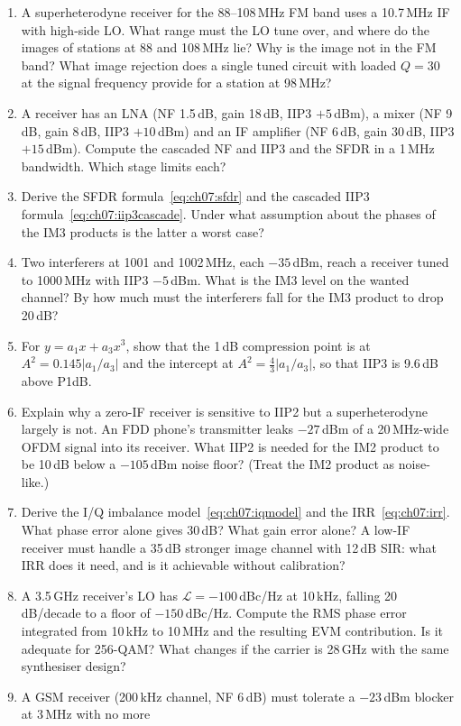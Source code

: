 \problems
\begin{enumerate}[label=\thechapter.\arabic*]
\item A superheterodyne receiver for the 88--108\,MHz FM band uses a 10.7\,MHz IF with high-side LO.
What range must the LO tune over, and where do the images of stations at 88 and 108\,MHz lie? Why is the
image not in the FM band? What image rejection does a single tuned circuit with loaded $Q=30$ at
the signal frequency provide for a station at 98\,MHz?
\item A receiver has an LNA (NF 1.5\,dB, gain 18\,dB, IIP3 $+5$\,dBm), a mixer (NF 9\,dB, gain 8\,dB,
IIP3 $+10$\,dBm) and an IF amplifier (NF 6\,dB, gain 30\,dB, IIP3 $+15$\,dBm). Compute the cascaded NF
and IIP3 and the SFDR in a 1\,MHz bandwidth. Which stage limits each?
\item Derive the SFDR formula~\eqref{eq:ch07:sfdr} and the cascaded IIP3 formula~\eqref{eq:ch07:iip3cascade}.
Under what assumption about the phases of the IM3 products is the latter a worst case?
\item Two interferers at 1001 and 1002\,MHz, each $-35$\,dBm, reach a receiver tuned to 1000\,MHz with
IIP3 $-5$\,dBm. What is the IM3 level on the wanted channel? By how much must the interferers fall for
the IM3 product to drop 20\,dB?
\item For $y=a_1x+a_3x^3$, show that the 1\,dB compression point is at $A^2=0.145|a_1/a_3|$ and the
intercept at $A^2=\tfrac43|a_1/a_3|$, so that IIP3 is 9.6\,dB above P1dB.
\item Explain why a zero-IF receiver is sensitive to IIP2 but a superheterodyne largely is not. An FDD
phone's transmitter leaks $-27$\,dBm of a 20\,MHz-wide OFDM signal into its receiver. What IIP2 is needed
for the IM2 product to be 10\,dB below a $-105$\,dBm noise floor? (Treat the IM2 product as noise-like.)
\item Derive the I/Q imbalance model~\eqref{eq:ch07:iqmodel} and the IRR~\eqref{eq:ch07:irr}. What phase
error alone gives 30\,dB? What gain error alone? A low-IF receiver must handle a 35\,dB stronger image
channel with 12\,dB SIR: what IRR does it need, and is it achievable without calibration?
\item A 3.5\,GHz receiver's LO has $\mathcal{L}=-100$\,dBc/Hz at 10\,kHz, falling 20\,dB/decade to a floor of
$-150$\,dBc/Hz. Compute the RMS phase error integrated from 10\,kHz to 10\,MHz and the resulting EVM
contribution. Is it adequate for 256-QAM? What changes if the carrier is 28\,GHz with the same synthesiser
design?
\item A GSM receiver (200\,kHz channel, NF 6\,dB) must tolerate a $-23$\,dBm blocker at 3\,MHz with no more

\end{enumerate}
